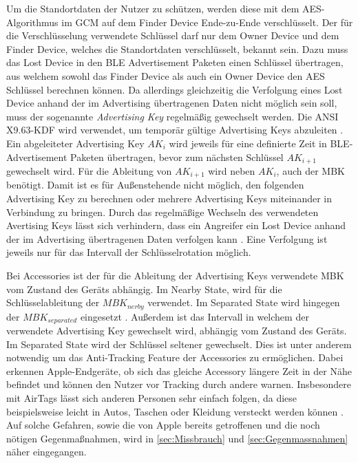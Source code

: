 Um die Standortdaten der Nutzer zu schützen, werden diese mit dem \ac{AES}-Algorithmus im \ac{GCM} auf dem Finder Device Ende-zu-Ende verschlüsselt.
Der für die Verschlüsselung verwendete Schlüssel darf nur dem Owner Device und dem Finder Device, welches die Standortdaten verschlüsselt, bekannt sein.
Dazu muss das Lost Device in den \ac{BLE} Advertisement Paketen einen Schlüssel übertragen, aus welchem sowohl das Finder Device als auch ein Owner Device den \ac{AES} Schlüssel berechnen können.
Da allerdings gleichzeitig die Verfolgung eines Lost Device anhand der im Advertising übertragenen Daten nicht möglich sein soll, muss der sogenannte \textit{Advertising Key} regelmäßig gewechselt werden.
Die ANSI X9.63-\ac{KDF} wird verwendet, um temporär gültige Advertising Keys abzuleiten \cite{Apple_FindMySpec,Heinrich_FindMy}.
Ein abgeleiteter Advertising Key $AK_i$ wird jeweils für eine definierte Zeit in \ac{BLE}-Advertisement Paketen übertragen, bevor zum nächsten Schlüssel $AK_{i+1}$ gewechselt wird.
Für die Ableitung von $AK_{i+1}$ wird neben $AK_{i}$, auch der \ac{MBK} benötigt.
Damit ist es für Außenstehende nicht möglich, den folgenden Advertising Key zu berechnen oder mehrere Advertising Keys miteinander in Verbindung zu bringen.
Durch das regelmäßige Wechseln des verwendeten Avertising Keys lässt sich verhindern, dass ein Angreifer ein Lost Device anhand der im Advertising übertragenen Daten verfolgen kann \cite{Heinrich_FindMy}.
Eine Verfolgung ist jeweils nur für das Intervall der Schlüsselrotation möglich.

Bei Accessories ist der für die Ableitung der Advertising Keys verwendete \ac{MBK} vom Zustand des Geräts abhängig.
Im Nearby State, wird für die Schlüsselableitung der $MBK_{nerby}$ verwendet.
Im Separated State wird hingegen der $MBK_{separated}$ eingesetzt \cite{Apple_FindMySpec}.
Außerdem ist das Intervall in welchem der verwendete Advertising Key gewechselt wird, abhängig vom Zustand des Geräts.
Im Separated State wird der Schlüssel seltener gewechselt.
Dies ist unter anderem notwendig um das Anti-Tracking Feature der Accessories zu ermöglichen.
Dabei erkennen Apple-Endgeräte, ob sich das gleiche Accessory längere Zeit in der Nähe befindet und können den Nutzer vor Tracking durch andere warnen.
Insbesondere mit AirTags lässt sich anderen Personen sehr einfach folgen, da diese beispielsweise leicht in Autos, Taschen oder Kleidung versteckt werden können \cite{Heinrich_AirGuard}.
Auf solche Gefahren, sowie die von Apple bereits getroffenen und die noch nötigen Gegenmaßnahmen, wird in \autoref{sec:Missbrauch} und \autoref{sec:Gegenmassnahmen} näher eingegangen.


